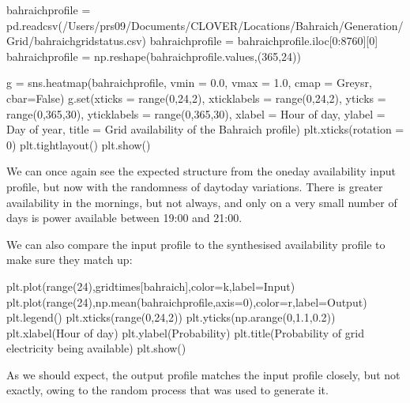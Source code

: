 \documentclass[letterpaper,10pt,english]{sphinxmanual}
\begin{document}
\begin{sphinxVerbatim}[commandchars=\\\{\}]
bahraich\PYGZus{}profile = pd.read\PYGZus{}csv(\PYGZdq{}/Users/prs09/Documents/CLOVER/Locations/Bahraich/Generation/Grid/bahraich\PYGZus{}grid\PYGZus{}status.csv\PYGZdq{})
bahraich\PYGZus{}profile = bahraich\PYGZus{}profile.iloc[0:8760][\PYGZsq{}0\PYGZsq{}]
bahraich\PYGZus{}profile = np.reshape(bahraich\PYGZus{}profile.values,(365,24))

g = sns.heatmap(bahraich\PYGZus{}profile,
                vmin = 0.0, vmax = 1.0,
                cmap = \PYGZsq{}Greys\PYGZus{}r\PYGZsq{}, cbar=False)
g.set(xticks = range(0,24,2), xticklabels = range(0,24,2),
      yticks = range(0,365,30), yticklabels = range(0,365,30),
      xlabel = \PYGZsq{}Hour of day\PYGZsq{}, ylabel = \PYGZsq{}Day of year\PYGZsq{},
      title = \PYGZsq{}Grid availability of the Bahraich profile\PYGZsq{})
plt.xticks(rotation = 0)
plt.tight\PYGZus{}layout()
plt.show()
\end{sphinxVerbatim}

\noindent{}

\sphinxAtStartPar
We can once again see the expected structure from the one\sphinxhyphen{}day
availability input profile, but now with the randomness of day\sphinxhyphen{}to\sphinxhyphen{}day
variations. There is greater availability in the mornings, but not
always, and only on a very small number of days is power available
between 19:00 and 21:00.

\sphinxAtStartPar
We can also compare the  input profile to the synthesised
availability profile to make sure they match up:

\begin{sphinxVerbatim}[commandchars=\\\{\}]
plt.plot(range(24),grid\PYGZus{}times[\PYGZsq{}bahraich\PYGZsq{}],color=\PYGZsq{}k\PYGZsq{},label=\PYGZsq{}Input\PYGZsq{})
plt.plot(range(24),np.mean(bahraich\PYGZus{}profile,axis=0),color=\PYGZsq{}r\PYGZsq{},label=\PYGZsq{}Output\PYGZsq{})
plt.legend()
plt.xticks(range(0,24,2))
plt.yticks(np.arange(0,1.1,0.2))
plt.xlabel(\PYGZsq{}Hour of day\PYGZsq{})
plt.ylabel(\PYGZsq{}Probability\PYGZsq{})
plt.title(\PYGZsq{}Probability of grid electricity being available\PYGZsq{})
plt.show()
\end{sphinxVerbatim}

\noindent{}

\sphinxAtStartPar
As we should expect, the output profile matches the input profile
closely, but not exactly, owing to the random process that was used to
generate it.
\end{document}
